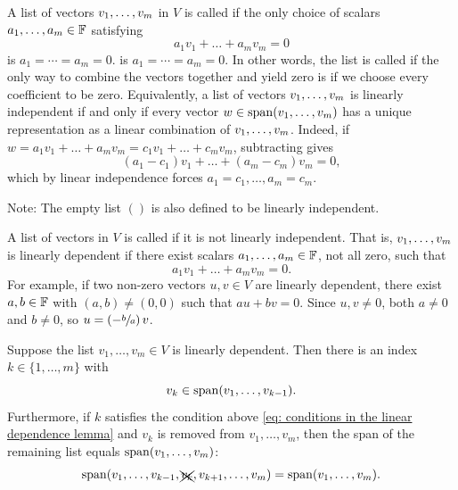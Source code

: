 \setcounter{thm}{14}
\begin{mydef} 
  A list of vectors $v_1, \dots, v_m$ in $V$ is called \qt{\lid} if the only choice of scalars $a_1, \dots, a_m \in \mathbb{F}$ satisfying
  \begin{equation}
    a_1 v_1 + \dots + a_m v_m = 0
  \end{equation}
  is $a_1 = \cdots = a_m = 0$.
  is $a_1 = \cdots = a_m = 0$. In other words, the list is called \lid{} if the only way to combine the vectors together and yield zero is if we choose every coefficient to be zero.
  Equivalently, a list of vectors $v_1, \dots, v_m$ is linearly independent if and only if every vector $w \in \operatorname{span} (v_1, \dots, v_m)$ has a unique representation as a linear combination of $v_1, \dots, v_m$.
  Indeed, if $w = a_1 v_1 + \dots + a_m v_m = c_1 v_1 + \dots + c_m v_m$, subtracting gives
  \begin{equation}
    (a_1 - c_1) v_1 + \dots + (a_m - c_m) v_m = 0,
  \end{equation}
  which by linear independence forces $a_1 = c_1, \dots, a_m = c_m$.

  Note: The empty list $()$ is also defined to be linearly independent.
\end{mydef}

\begin{mydef} 
  A list of vectors in $V$ is called  if it is not linearly independent.
  That is, $v_1, \dots, v_m$ is linearly dependent if there exist scalars $a_1, \dots, a_m \in \mathbb{F}$, not all zero, such that
  \begin{equation}
    a_1 v_1 + \dots + a_m v_m = 0.
  \end{equation}
  For example, if two non-zero vectors $u, v \in V$ are linearly dependent, there exist $a, b \in \mathbb{F}$ with $(a,b) \neq (0,0)$ such that $au + bv = 0$. Since $u, v \neq 0$, both $a \neq 0$ and $b \neq 0$, so $u = \left( -\sfrac{b}{a} \right) v$.
\end{mydef}

\setcounter{thm}{18}
\begin{thm} 
  \label{thm: linear dependence lemma}
  Suppose the list $v_{1}, \dots, v_{m}\in V$ is linearly dependent. Then there is an index $k \in \{ 1, \dots, m \}$ with
  \begin{equation}
    \label{eq: conditions in the linear dependence lemma}
    v_k \in \operatorname{span} (v_1, \dots, v_{k-1}).
  \end{equation}
  Furthermore, if $k$ satisfies the condition above \eqref{eq: conditions in the linear dependence lemma} and $v_k$ is removed from $v_1, \dots, v_m$, then the span of the remaining list equals $\operatorname{span} (v_1, \dots, v_{m})$:
  \begin{equation}
    \operatorname{span} (v_1, \dots, v_{k-1}, \xcancel{v_k}, v_{k+1}, \dots, v_m) = \operatorname{span} (v_1, \dots, v_m).
  \end{equation}
\end{thm}


